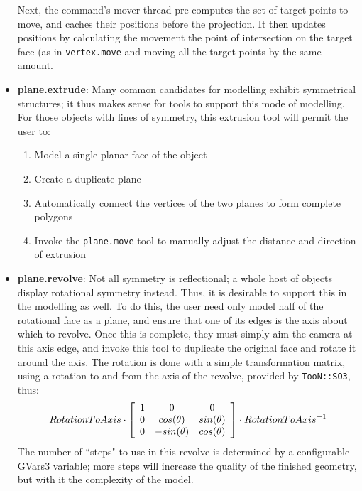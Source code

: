 \documentclass[a4paper,10pt]{report}
\begin{document}
\begin{itemize}
{Next, the command's mover thread pre-computes the set of target points to move, and caches their positions before the projection. It then updates positions by calculating the movement the point of intersection on the target face (as in \texttt{vertex.move} and moving all the target points by the same amount.}

\item{\textbf{plane.extrude}: Many common candidates for modelling exhibit symmetrical structures; it thus makes sense for tools to support this mode of modelling. For those objects with lines of symmetry, this extrusion tool will permit the user to:

\begin{enumerate}
 \item{Model a single planar face of the object}
 \item{Create a duplicate plane}
 \item{Automatically connect the vertices of the two planes to form complete polygons}
 \item{Invoke the \texttt{plane.move} tool to manually adjust the distance and direction of extrusion}
\end{enumerate}
}

\item{\textbf{plane.revolve}: Not all symmetry is reflectional; a whole host of objects display rotational symmetry instead. Thus, it is desirable to support this in the modelling as well. To do this, the user need only model half of the rotational face as a plane, and ensure that one of its edges is the axis about which to revolve. Once this is complete, they must simply aim the camera at this axis edge, and invoke this tool to duplicate the original face and rotate it around the axis. The rotation is done with a simple transformation matrix, using a rotation to and from the axis of the revolve, provided by \texttt{TooN::SO3}, thus:
\begin{eqnarray*}
 RotationToAxis \cdot  \left[ 
  \begin{array}{c c c}
    1 & 0 & 0 \\ 
    0 & cos( \theta ) & sin( \theta ) \\ 
    0 & -sin( \theta ) & cos( \theta ) 
  \end{array}\right] \cdot RotationToAxis^{-1}
\end{eqnarray*}
The number of ``steps" to use in this revolve is determined by a configurable GVars3 variable; more steps will increase the quality of the finished geometry, but with it the complexity of the model.}


\end{itemize}
\end{document}
